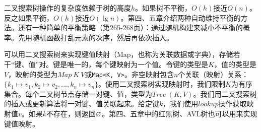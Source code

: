 \documentclass[b5paper]{ctexart}
\begin{document}
 \label{sec:bst-random-build}
二叉搜索树操作的复杂度依赖于树的高度$h$。如果树不平衡，$O(h)$接近$O(n)$。反之如果平衡，$O(h)$接近$O(\lg n)$。第四、五章介绍两种自动维持平衡的方法。还有一种简单的平衡策略（\cite{CLRS}第265-268页）：通过随机构建来减小不平衡的概率。先用随机函数打乱元素的次序，然后再依次插入。

可以用二叉搜索树来实现键值映射（Map，也称为关联数据或字典），存储若干“键、值”对。键是唯一的，每个键映射为一个值。令键的类型是$K$，值的类型是$V$，映射的类型为$Map\ K\ V$或\texttt{Map<K, V>}。非空映射包含$n$个关联（映射）关系：$\{k_1 \mapsto v_1, k_2 \mapsto v_2, ..., k_n \mapsto v_n\}$。使用二叉搜索树实现映射时，我们限制$K$为有序集合。每个二叉树节点存储一对键、值，类型为$Tree\ (K, V)$。我们用二叉搜索树的插入或更新算法将一对键、值关联起来。给定键$k$，我们使用$lookup$操作获取映射值$v$。如果$k$不存在，则返回$\varnothing$。第四、五章中的红黑树、AVL树也可以用来实现键值映射。

\begin{Exercise}\label{ex:bst-delete}
\end{Exercise}
\end{document}
